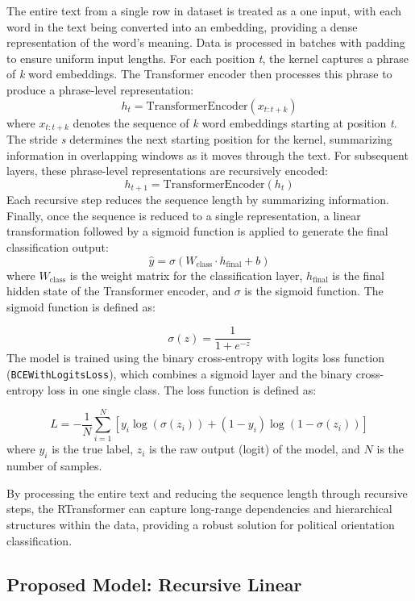 \documentclass[10pt, a4paper]{article}
\begin{document}
The entire text from a single row in dataset is treated as a one input, with each word in the text being converted into an embedding, providing a dense representation of the word's meaning. Data is processed in batches with padding to ensure uniform input lengths. For each position \textit{t}, the kernel captures a phrase of \textit{k} word embeddings. The Transformer encoder then processes this phrase to produce a phrase-level representation:
\[
h_{t} = \text{TransformerEncoder}(x_{t:t+k})
\]
where \(\mathit{x}_{t:t+k}\) denotes the sequence of \textit{k} word embeddings starting at position \textit{t}. The stride \textit{s} determines the next starting position for the kernel, summarizing information in overlapping windows as it moves through the text. For subsequent layers, these phrase-level representations are recursively encoded:
\[
h_{t+1} = \text{TransformerEncoder}(h_{t})
\]
Each recursive step reduces the sequence length by summarizing information. Finally, once the sequence is reduced to a single representation, a linear transformation followed by a sigmoid function is applied to generate the final classification output:
\[
\hat{y} = \sigma(W_{\text{class}} \cdot h_{\text{final}} + b)
\]
where \( W_{\text{class}} \) is the weight matrix for the classification layer, \( h_{\text{final}} \) is the final hidden state of the Transformer encoder, and \( \sigma \) is the sigmoid function. The sigmoid function is defined as:

\[
\sigma(z) = \frac{1}{1 + e^{-z}}
\]
The model is trained using the binary cross-entropy with logits loss function (\texttt{BCEWithLogitsLoss}), which combines a sigmoid layer and the binary cross-entropy loss in one single class. The loss function is defined as:

\[
L = -\frac{1}{N} \sum_{i=1}^{N} \left[ y_{i} \log(\sigma(z_{i})) + (1 - y_{i}) \log(1 - \sigma(z_{i})) \right]
\]
where \( y_{i} \) is the true label, \( z_{i} \) is the raw output (logit) of the model, and \( N \) is the number of samples.


By processing the entire text and reducing the sequence length through recursive steps, the RTransformer can capture long-range dependencies and hierarchical structures within the data, providing a robust solution for political orientation classification.

\subsection{Proposed Model: Recursive Linear} 
\end{document}
